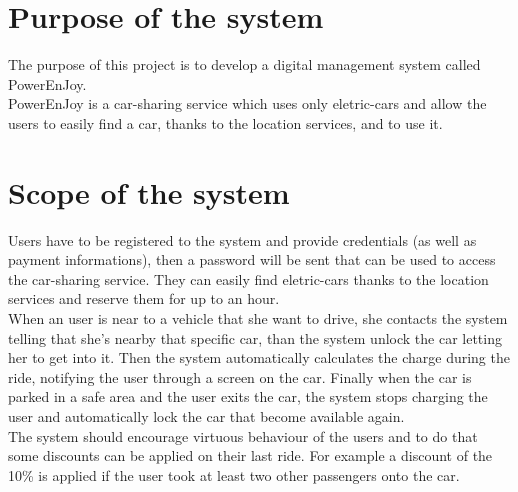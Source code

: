 \section{Purpose of the system}
The purpose of this project is to develop a digital management system called PowerEnJoy. 
\\PowerEnJoy is a car-sharing service which uses only eletric-cars and allow the users to easily find a car, thanks to the location services, and to use it. 

\section{Scope of the system}
Users have to be registered to the system and provide credentials (as well as payment informations), then a password will be sent that can be used to access the car-sharing service. They can easily find eletric-cars thanks to the location services and reserve them for up to an hour. 
\\When an user is near to a vehicle that she want to drive, she contacts the system telling that she's nearby that specific car, than the system unlock the car letting her to get into it. 
Then the system automatically calculates the charge during the ride, notifying the user through a screen on the car. 
Finally when the car is parked in a safe area and the user exits the car, the system stops charging the user and automatically lock the car that become available again.
\\The system should encourage virtuous behaviour of the users and to do that some discounts can be applied on their last ride. For example a discount of the 10\% is applied if the user took at least two other passengers onto the car. 
\begin{comment}
Other discounts are applied if a car is left with no more than 50\% of the battery empty or if the user left the car in a special park where it can be recharged(20\%) 
and she takes care of plugging the car into the power grid (30\%). 
\\On the other side the system charges 30\% more on the last ride if the car is left at more than 3 Km from the nearest power grid station or with more than 80\% of the battery empty in order to compensate for the cost required to re-charge the car on-site.
\end{comment}

